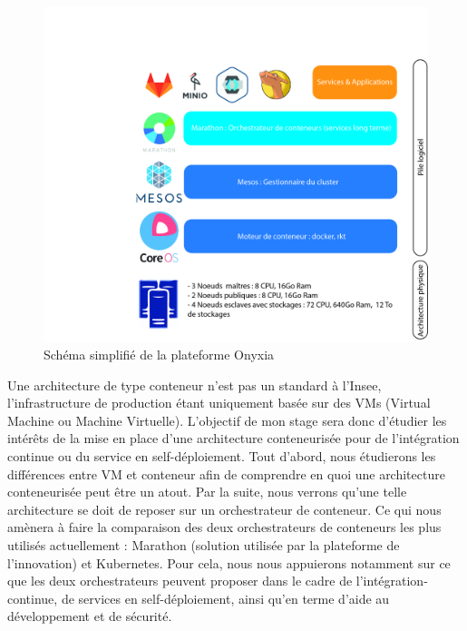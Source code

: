 \documentclass[11pt,fleqn]{book} %
\begin{document}
\begin{figure}[H]\centering
\renewcommand{\figurename}{Graphique}
\includegraphics[scale=0.2,clip,trim={18cm, 0cm, 0cm, 11.6cm}]{Pictures/onyxia/Onyxia archi.jpg}
\captionsetup{margin=1.5cm,format=hang,justification=justified}
\caption[]{Schéma simplifié de la plateforme Onyxia \newline}
\end{figure}

Une architecture de type conteneur n'est pas un standard à l'Insee, l'infrastructure de production étant uniquement basée sur des VMs (Virtual Machine ou Machine Virtuelle). L'objectif de mon stage sera donc d'étudier les intérêts de la mise en place d'une architecture conteneurisée pour de l'intégration continue ou du service en self-déploiement. Tout d'abord, nous étudierons les différences entre VM et conteneur afin de comprendre en quoi une architecture conteneurisée peut être un atout. Par la suite, nous verrons qu'une telle architecture se doit de reposer sur un orchestrateur de conteneur. Ce qui nous amènera à faire la comparaison des deux orchestrateurs de conteneurs les plus utilisés actuellement : Marathon (solution utilisée par la plateforme de l'innovation) et Kubernetes. Pour cela, nous nous appuierons notamment sur ce que les deux orchestrateurs peuvent proposer dans le cadre de l'intégration-continue, de services en self-déploiement, ainsi qu'en terme d'aide au développement et de sécurité.


\end{document}
